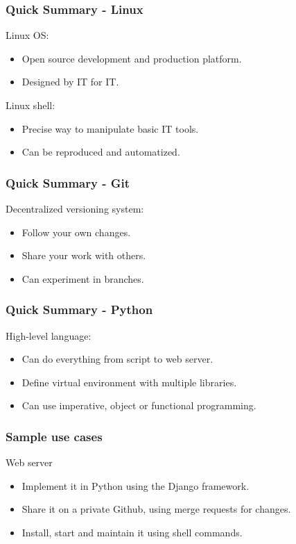 \begin{frame}
\frametitle{Quick Summary - Linux}
   Linux OS:
   \begin{itemize}
      \item Open source development and production platform.
      \item Designed by IT for IT.
   \end{itemize}
   Linux shell:
   \begin{itemize}
      \item Precise way to manipulate basic IT tools.
      \item Can be reproduced and automatized.
   \end{itemize}
\end{frame}

\begin{frame}
\frametitle{Quick Summary - Git}
   Decentralized versioning system:
   \begin{itemize}
      \item Follow your own changes.
      \item Share your work with others.
      \item Can experiment in branches.
   \end{itemize}
\end{frame}

\begin{frame}
\frametitle{Quick Summary - Python}
   High-level language:
   \begin{itemize}
      \item Can do everything from script to web server.
      \item Define virtual environment with multiple libraries.
      \item Can use imperative, object or functional programming.
   \end{itemize}
\end{frame}

\begin{frame}
\frametitle{Sample use cases}
   Web server
   \begin{itemize}
      \item Implement it in Python using the Django framework.
      \item Share it on a private Github, using merge requests for changes.
      \item Install, start and maintain it using shell commands.
   \end{itemize}
\end{frame}

